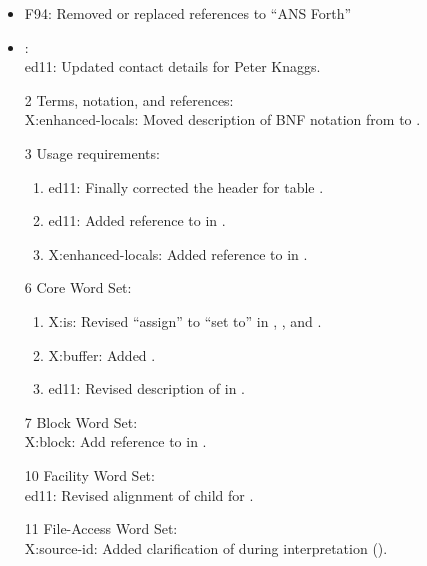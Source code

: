 	\begin{itemize}
	\item \textsf{F94}: Removed or replaced references to ``ANS Forth''

	\item {}: \\						%
		\textsf{ed11}: Updated contact details for Peter Knaggs.

	\item[2] Terms, notation, and references: \\	%
		\textsf{X:enhanced-locals}: Moved description of BNF notation from
			 to .

	\item[3] Usage requirements:					%
		\begin{enumerate}
		\item \textsf{ed11}: Finally corrected the header for table .
		\item \textsf{ed11}: Added reference to  in .
		\item \textsf{X:enhanced-locals}: Added reference to  in .
		\end{enumerate}

	\item[6] Core Word Set:							%
		\begin{enumerate}
		\item \textsf{X:is}: Revised ``assign'' to ``set to'' in
			,
			,
			 and
			.
		\item \textsf{X:buffer}: Added .
		\item \textsf{ed11}: Revised description of \texttt{} in .
		\end{enumerate}

	\item[7] Block Word Set: \\					%
		\textsf{X:block}: Add reference to  in .

	\item[10] Facility Word Set: \\				%
		\textsf{ed11}: Revised alignment of child for .

	\item[11] File-Access Word Set: \\			%
		\textsf{X:source-id}: Added clarification of  during interpretation ().


\end{itemize}
